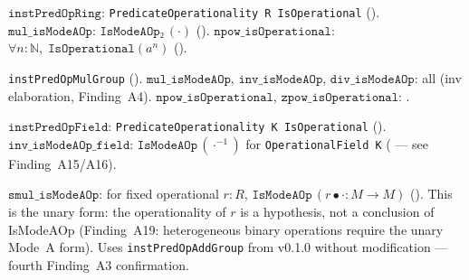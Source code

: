 \begin{theorem}
\label{thm:ring_modeA}
\leanok
{}
$\texttt{instPredOpRing}$: \texttt{PredicateOperationality R IsOperational}
(\axiomprofile{[]}).
$\texttt{mul\_isModeAOp}$: $\texttt{IsModeAOp₂}\,(\cdot)$ (\axiomprofile{[]}).
$\texttt{npow\_isOperational}$: $\forall n : \mathbb{N},\;
\texttt{IsOperational}(a^n)$ (\axiomprofile{[]}).
\end{theorem}

\begin{theorem}
\label{thm:mulgroup_modeA}
\leanok
{}
\texttt{instPredOpMulGroup} (\axiomprofile{[]}).
$\texttt{mul\_isModeAOp}$, $\texttt{inv\_isModeAOp}$, $\texttt{div\_isModeAOp}$:
all \axiomprofile{[propext]} (inv elaboration, Finding~A4).
$\texttt{npow\_isOperational}$, $\texttt{zpow\_isOperational}$: \axiomprofile{[]}.
\end{theorem}

\begin{theorem}
\label{thm:field_modeA}
\leanok
{}
$\texttt{instPredOpField}$: \texttt{PredicateOperationality K IsOperational}
().
$\texttt{inv\_isModeAOp\_field}$: $\texttt{IsModeAOp}\,({\cdot}^{-1})$ for
\texttt{OperationalField K}
(
--- see Finding~A15/A16).
\end{theorem}

\begin{theorem}
\label{thm:module_modeA}
\leanok
{}
$\texttt{smul\_isModeAOp}$: for fixed operational $r : R$,
$\texttt{IsModeAOp}\,(r \bullet \cdot : M \to M)$ (\axiomprofile{[]}).
This is the unary form: the operationality of $r$ is a hypothesis, not a
conclusion of IsModeAOp (Finding~A19: heterogeneous binary operations
require the unary Mode~A form).  Uses \texttt{instPredOpAddGroup} from
v0.1.0 without modification --- fourth Finding~A3 confirmation.
\end{theorem}

